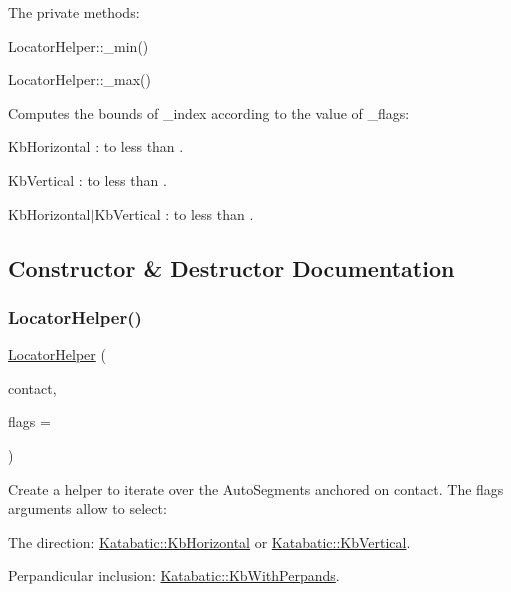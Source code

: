 The private methods\+:
\begin{DoxyItemize}
\item {\ttfamily Locator\+Helper\+::\+\_\+min()} 
\item {\ttfamily Locator\+Helper\+::\+\_\+max()} 
\end{DoxyItemize}

Computes the bounds of {\ttfamily \+\_\+index} according to the value of {\ttfamily \+\_\+flags\+:} 
\begin{DoxyItemize}
\item {\ttfamily Kb\+Horizontal} \+: {} to less than {}.
\item {\ttfamily Kb\+Vertical} \+: {} to less than {}.
\item {\ttfamily Kb\+Horizontal$\vert$\+Kb\+Vertical} \+: {} to less than {}. 
\end{DoxyItemize}

\subsection{Constructor \& Destructor Documentation}
\mbox{\label{classKatabatic_1_1LocatorHelper_af44c2fcc73d387e3e3b5c334f25b070b}} 
\subsubsection{\texorpdfstring{Locator\+Helper()}{LocatorHelper()}}
{\footnotesize\ttfamily \mbox{\hyperlink{classKatabatic_1_1LocatorHelper}{Locator\+Helper}} (\begin{DoxyParamCaption}\item[{\mbox{\hyperlink{classKatabatic_1_1AutoContact}{Auto\+Contact}} $\ast$}]{contact,  }\item[{unsigned int}]{flags = {} }\end{DoxyParamCaption})\hspace{0.3cm}{\ttfamily [inline]}}

Create a helper to iterate over the Auto\+Segments anchored on {\ttfamily contact}. The {\ttfamily flags} arguments allow to select\+:
\begin{DoxyItemize}
\item The direction\+: \mbox{\hyperlink{namespaceKatabatic_a2af2ad6b6441614038caf59d04b3b217a1a9045673c5d3c30b067100f1440ae1b}{Katabatic\+::\+Kb\+Horizontal}} or \mbox{\hyperlink{namespaceKatabatic_a2af2ad6b6441614038caf59d04b3b217a284cad95203a27172838b09e396e3590}{Katabatic\+::\+Kb\+Vertical}}.
\item Perpandicular inclusion\+: \mbox{\hyperlink{namespaceKatabatic_a2af2ad6b6441614038caf59d04b3b217ae2d033c8f78b61468c827de8db5fe839}{Katabatic\+::\+Kb\+With\+Perpands}}.
\end{DoxyItemize}

